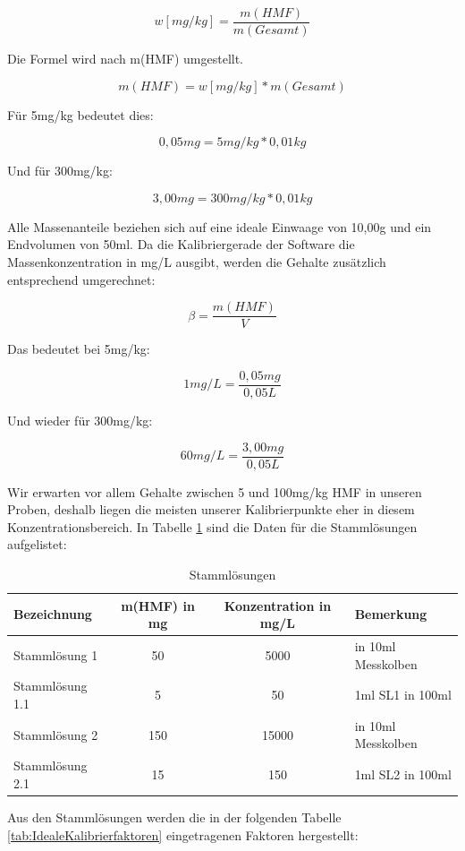     \[w[mg/kg]=\frac{ m(HMF) }{ m(Gesamt) }\]
    
Die Formel wird nach m(HMF) umgestellt.

    \[m(HMF)=w[mg/kg]*m(Gesamt)\]
    
Für 5mg/kg bedeutet dies:
    
    \[0,05mg=5mg/kg*0,01kg\]
    
Und für 300mg/kg:

    \[3,00mg=300mg/kg*0,01kg\]
    
Alle Massenanteile beziehen sich auf eine ideale Einwaage von 10,00g und ein Endvolumen von 50ml.
Da die Kalibriergerade der Software die Massenkonzentration in mg/L ausgibt, werden die Gehalte zusätzlich entsprechend umgerechnet:

\[\beta=\frac{ m(HMF) }{ V }\]

Das bedeutet bei 5mg/kg:

\[1mg/L=\frac{ 0,05mg }{ 0,05L }\]

Und wieder für 300mg/kg:

\[60mg/L=\frac{ 3,00mg }{ 0,05L }\]

Wir erwarten vor allem Gehalte zwischen 5 und 100mg/kg HMF in unseren Proben, deshalb liegen die meisten unserer Kalibrierpunkte eher in diesem Konzentrationsbereich.
In Tabelle \ref{tab:Stammlösungen} sind die Daten für die Stammlösungen aufgelistet:

\begin{table}[htbp]
    \centering
    \caption{Stammlösungen}
        \begin{tabular}{l|c|c|l}
            Bezeichnung & m(HMF) in mg & Konzentration in mg/L & Bemerkung\\
            \hline
            Stammlösung 1 & 50 & 5000  & in 10ml Messkolben\\
            \hline
            Stammlösung 1.1 & 5 & 50 & 1ml SL1 in 100ml\\
            \hline
            Stammlösung 2 & 150 & 15000 & in 10ml Messkolben\\
            \hline
            Stammlösung 2.1 & 15 & 150 & 1ml SL2 in 100ml\\
        \end{tabular}
        \label{tab:Stammlösungen}
\end{table}

Aus den Stammlösungen werden die in der folgenden Tabelle \ref{tab:IdealeKalibrierfaktoren} eingetragenen Faktoren hergestellt:

